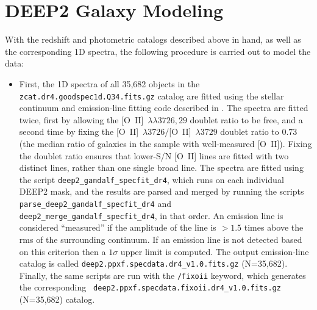 \documentclass[12pt]{article}
\newcommand{\oii}{[O~II]}
\newcommand{\oiilam}{[O~II]~\ensuremath{\lambda\lambda3726,29}}
\begin{document}

\section{DEEP2 Galaxy Modeling}


With the redshift and photometric catalogs described above in hand, as
well as the corresponding 1D spectra, the following procedure is
carried out to model the data:

\begin{itemize}
\item{First, the 1D spectra of all 35,682 objects in the {\tt
    zcat.dr4.goodspec1d.Q34.fits.gz} catalog are fitted using the
  stellar continuum and emission-line fitting code described in
  \citet{moustakas10a}.  The spectra are fitted twice, first by
  allowing the \oiilam{} doublet ratio to be free, and a second time
  by fixing the \oii~$\lambda3726/$\oii{}~$\lambda3729$ doublet ratio
  to $0.73$ (the median ratio of galaxies in the sample with
  well-measured \oii).  Fixing the doublet ratio ensures that
  lower-S/N \oii{} lines are fitted with two distinct lines, rather
  than one single broad line.  The spectra are fitted using the script
  {\tt deep2\_gandalf\_specfit\_dr4}, which runs on each individual
  DEEP2 mask, and the results are parsed and merged by running the
  scripts {\tt parse\_deep2\_gandalf\_specfit\_dr4} and {\tt
    deep2\_merge\_gandalf\_specfit\_dr4}, in that order.  An emission
  line is considered ``measured'' if the amplitude of the line is
  $>1.5$ times above the {\sc rms} of the surrounding continuum.  If
  an emission line is not detected based on this criterion then a
  $1\sigma$ upper limit is computed.  The output emission-line catalog
  is called {\tt deep2.ppxf.specdata.dr4\_v1.0.fits.gz} (N=35,682).
  Finally, the same scripts are run with the {\tt /fixoii} keyword,
  which generates the corresponding {\tt
    deep2.ppxf.specdata.fixoii.dr4\_v1.0.fits.gz} (N=35,682) catalog.}
     

\end{itemize}
\end{document}
